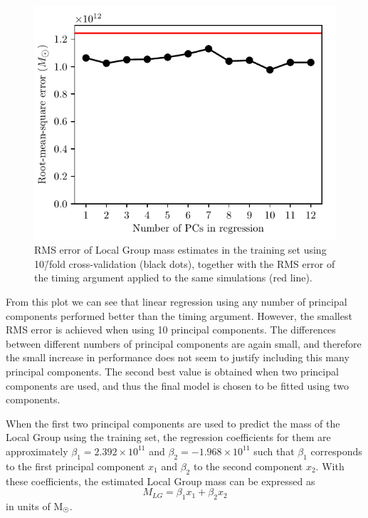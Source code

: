 \documentclass[english, twoside]{HYgradu}
\begin{document}
\begin{figure}
    \centering
    \includegraphics{kuvat/PCA/training-RMSE.pdf}
    \caption{RMS error of Local Group mass estimates in the training set using 10\=/fold cross-validation (black dots), together with the RMS error of the timing argument applied to the same simulations (red line).}\label{fig:pca-rmse-training}
\end{figure}

From this plot we can see that linear regression using any number of principal components performed better than the timing argument. However, the smallest RMS error is achieved when using 10 principal components. The differences between different numbers of principal components are again small, and therefore the small increase in performance does not seem to justify including this many principal components. The second best value is obtained when two principal components are used, and thus the final model is chosen to be fitted using two components.

When the first two principal components are used to predict the mass of the Local Group using the training set, the regression coefficients for them are approximately $\beta_1 = 2.392 \times 10^{11}$ and $\beta_2 = -1.968 \times 10^{11}$ such that $\beta_1$ corresponds to the first principal component $x_1$ and $\beta_2$ to the second component $x_2$. With these coefficients, the estimated Local Group mass can be expressed as
\begin{equation} \label{equ:pcr}
	M_{LG} = \beta_1 x_{1} + \beta_2 x_{2}
\end{equation}
in units of $\mathrm{M}_{\astrosun}$. 
\end{document}
